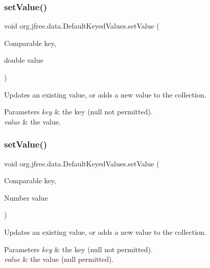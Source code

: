 \subsubsection{\texorpdfstring{set\+Value()}{setValue()}\hspace{0.1cm}{\footnotesize\ttfamily [1/2]}}
{\footnotesize\ttfamily void org.\+jfree.\+data.\+Default\+Keyed\+Values.\+set\+Value (\begin{DoxyParamCaption}\item[{Comparable}]{key,  }\item[{double}]{value }\end{DoxyParamCaption})}

Updates an existing value, or adds a new value to the collection.


\begin{DoxyParams}{Parameters}
{\em key} & the key ({\ttfamily null} not permitted). \\
\hline
{\em value} & the value. \\
\hline
\end{DoxyParams}
\mbox{\label{classorg_1_1jfree_1_1data_1_1_default_keyed_values_ab7f186e0cbc460c387f9e4ff505f99a0}} 
\subsubsection{\texorpdfstring{set\+Value()}{setValue()}\hspace{0.1cm}{\footnotesize\ttfamily [2/2]}}
{\footnotesize\ttfamily void org.\+jfree.\+data.\+Default\+Keyed\+Values.\+set\+Value (\begin{DoxyParamCaption}\item[{Comparable}]{key,  }\item[{Number}]{value }\end{DoxyParamCaption})}

Updates an existing value, or adds a new value to the collection.


\begin{DoxyParams}{Parameters}
{\em key} & the key ({\ttfamily null} not permitted). \\
\hline
{\em value} & the value ({\ttfamily null} permitted). \\
\hline
\end{DoxyParams}
\mbox{\label{classorg_1_1jfree_1_1data_1_1_default_keyed_values_af6c058aa3de36978d14dba6d2b40bf65}} 
